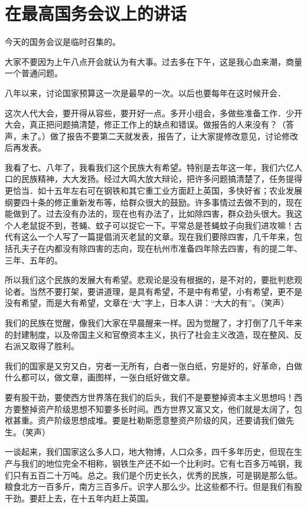 \section[在最高国务会议上的讲话（一九五八年一月二十八日）]{在最高国务会议上的讲话}


今天的国务会议是临时召集的。

大家不要因为上午八点开会就认为有大事。过去多在下午，这是我心血来潮，商量一个普通问题。

八年以来，讨论国家预算这一次是最早的一次。以后也要每年在这时候开会．

这次人代大会，要开得从容些，要开好一点。多开小组会，多做些准备工作．少开大会，真正把问题搞清楚，修正工作上的缺点和错误。做报告的人来没有？（答声，未了。）做了报告不要第二天就发表，报告了，让大家提修改意见，讨论修改后再发表。

我看了七、八年了，我看我们这个民族大有希望。特别是去年这一年，我们六亿人口的民族精神，大大发扬。经过大鸣大放大辩论，把许多问题搞清楚了，任务提得更恰当．如十五年左右可在钢铁和其它重工业方面赶上英国，多快好省；农业发展纲要四十条的修正重新发布等，给群众很大的鼓励。许多事情过去做不到的，现在能做到了。过去没有办法的，现在也有办法了，比如除四害，群众劲头很大。我这个人老鼠捉不到，苍蝇、蚊子可以捉它一下。平常总是苍蝇蚊子向我们进攻嘛！古代有这么一个人写了一篇提倡消灭老鼠的文章。现在我们要除四害，几千年来，包括孔夫子在内都没有除四害的志向，现在杭州市准备四年除去四害，有的提二年、三年、五年的。

所以我们这个民族的发展大有希望。悲观论是没有根据的，是不对的，要批判悲观论者。当然不要打架，要讲道理，是具有希望，不是中有希望，小有希望，更不是没有希望，而是大有希望，文章在“大”字上，日本人讲：“大大的有”。（笑声）

我们的民族在觉醒，像我们大家在早晨醒来一样。因为觉醒了，才打倒了几千年来的封建制度，以及帝国主义和官僚资本主义，执行了社会主义改造，现在整风、反右派又取得了胜利。

我们的国家是又穷又白，穷者一无所有，白者一张白纸，穷是好的，好革命，白做什么都可以，做文章，画图样，一张白纸好做文章。

要有股干劲，要使西方世界落在我们的后头，我们不是要整掉资本主义思想吗！西方要整掉资产阶级思想不知要多长时间。西方世界又富又文，他们就是太阔了，包袱甚重。资产阶级思想成堆。要是杜勒斯愿意整资产阶级的风，还要请我们做先生。（笑声）


一谈起来，我们国家这么多人口，地大物博，人口众多，四千多年历史，但现在生产与我们的地位完全不相称，钢铁生产还不如一个比利时。它有七百多万吨钢，我们只有五百二十万吨。总之。我们是个历史长久，优秀的民族，可是钢是那么低。粮食北方一百多斤，南方三百多斤。识字人那么少。比这些都不行。但是我们有股干劲。要赶上去，在十五年内赶上英国。


